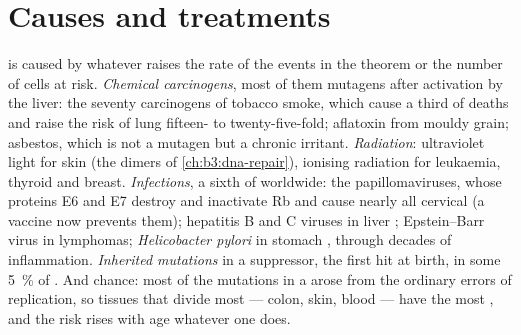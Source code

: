 \section{Causes and treatments}

\begin{proposition}[Causes]\label{prop:b3:cancer-biology:causes}
 is caused by whatever raises the rate of the events in the
theorem or the number of cells at risk. \emph{Chemical carcinogens},
most of them mutagens after activation by the liver: the seventy
carcinogens of tobacco smoke, which cause a third of  deaths and
raise the risk of lung  fifteen- to twenty-five-fold; aflatoxin
from mouldy grain; asbestos, which is not a mutagen but a chronic
irritant. \emph{Radiation}: ultraviolet light for skin (the dimers of
\cref{ch:b3:dna-repair}), ionising radiation for leukaemia, thyroid
and breast. \emph{Infections}, a sixth of  worldwide: the
papillomaviruses, whose proteins E6 and E7 destroy  and inactivate
Rb and cause nearly all cervical  (a vaccine now prevents them);
hepatitis B and C viruses in liver ; Epstein--Barr virus in
lymphomas; \emph{Helicobacter pylori} in stomach , through decades
of inflammation. \emph{Inherited mutations} in a  suppressor, the
first hit at birth, in some \qty{5}{\%} of . And chance: most
of the mutations in a  arose from the ordinary errors of
replication, so tissues that divide most --- colon, skin, blood ---
have the most , and the risk rises with age whatever one does.
\end{proposition}

